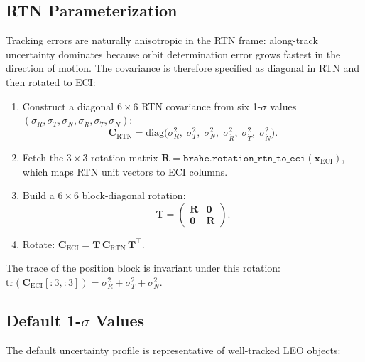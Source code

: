 \documentclass[11pt]{article}
\begin{document}
\subsection{RTN Parameterization}

Tracking errors are naturally anisotropic in the RTN frame: along-track
uncertainty dominates because orbit determination error grows fastest in the
direction of motion.  The covariance is therefore specified as diagonal in RTN
and then rotated to ECI:

\begin{enumerate}
  \item Construct a diagonal $6\times6$ RTN covariance from six 1-$\sigma$
        values $(\sigma_R, \sigma_T, \sigma_N, \sigma_{\dot R}, \sigma_{\dot T},
        \sigma_{\dot N})$:
        \begin{equation}
          \mathbf{C}_\text{RTN} = \mathrm{diag}
            \bigl(\sigma_R^2,\; \sigma_T^2,\; \sigma_N^2,\;
                  \sigma_{\dot R}^2,\; \sigma_{\dot T}^2,\; \sigma_{\dot N}^2\bigr).
        \end{equation}
  \item Fetch the $3\times3$ rotation matrix
        $\mathbf{R} = \texttt{brahe.rotation\_rtn\_to\_eci}(\mathbf{x}_\text{ECI})$,
        which maps RTN unit vectors to ECI columns.
  \item Build a $6\times6$ block-diagonal rotation:
        \begin{equation}
          \mathbf{T} = \begin{pmatrix} \mathbf{R} & \mathbf{0} \\
                                      \mathbf{0} & \mathbf{R} \end{pmatrix}.
        \end{equation}
  \item Rotate: $\mathbf{C}_\text{ECI} = \mathbf{T}\,\mathbf{C}_\text{RTN}\,\mathbf{T}^\top$.
\end{enumerate}

The trace of the position block is invariant under this rotation:
$\mathrm{tr}(\mathbf{C}_\text{ECI}[:3,:3]) = \sigma_R^2 + \sigma_T^2 + \sigma_N^2$.

\subsection{Default 1-$\sigma$ Values}

The default uncertainty profile is representative of well-tracked LEO objects:
\end{document}
